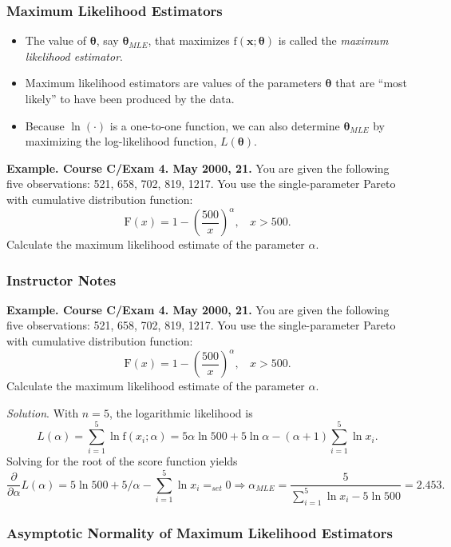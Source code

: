 \documentclass[]{book}
\theoremstyle{definition}
\theoremstyle{definition}
\theoremstyle{definition}
\theoremstyle{remark}
\begin{document}
\subsubsection{Maximum Likelihood
Estimators}\label{maximum-likelihood-estimators}

\begin{itemize}
\item
  The value of \(\boldsymbol \theta\), say \(\boldsymbol \theta_{MLE}\),
  that maximizes \(\mathrm{f}(\mathbf{x};\boldsymbol \theta)\) is called
  the \emph{maximum likelihood estimator}.
\item
  Maximum likelihood estimators are values of the parameters
  \(\boldsymbol \theta\) that are ``most likely'' to have been produced
  by the data.
\item
  Because \(\ln(\cdot)\) is a one-to-one function, we can also determine
  \(\boldsymbol \theta_{MLE}\) by maximizing the log-likelihood
  function, \(L(\boldsymbol \theta)\).
\end{itemize}

\textbf{Example. Course C/Exam 4. May 2000, 21.} You are given the
following five observations: 521, 658, 702, 819, 1217. You use the
single-parameter Pareto with cumulative distribution function:
\[\mathrm{F}(x) = 1- \left(\frac{500}{x}\right)^{\alpha}, ~~~~ x>500 .\]
Calculate the maximum likelihood estimate of the parameter \(\alpha\).

\subsubsection{Instructor Notes}\label{instructor-notes}

\textbf{Example. Course C/Exam 4. May 2000, 21.} You are given the
following five observations: 521, 658, 702, 819, 1217. You use the
single-parameter Pareto with cumulative distribution function:
\[\mathrm{F}(x) = 1- \left(\frac{500}{x}\right)^{\alpha}, ~~~~ x>500 .\]
Calculate the maximum likelihood estimate of the parameter \(\alpha\).

\emph{Solution}. With \(n=5\), the logarithmic likelihood is
\[L(\alpha ) =  \sum_{i=1}^5 \ln \mathrm{f}(x_i;\alpha ) =  5 \alpha \ln 500 + 5 \ln \alpha
-(\alpha+1) \sum_{i=1}^5 \ln x_i.\] Solving for the root of the score
function yields
\[\frac{ \partial}{\partial \alpha } L(\alpha ) =    5  \ln 500 + 5 / \alpha -  \sum_{i=1}^5 \ln x_i
=_{set} 0 \Rightarrow \alpha_{MLE} = \frac{5}{\sum_{i=1}^5 \ln x_i - 5  \ln 500 } = 2.453 .\]

\subsubsection{Asymptotic Normality of Maximum Likelihood
Estimators}\label{asymptotic-normality-of-maximum-likelihood-estimators}
\end{document}
